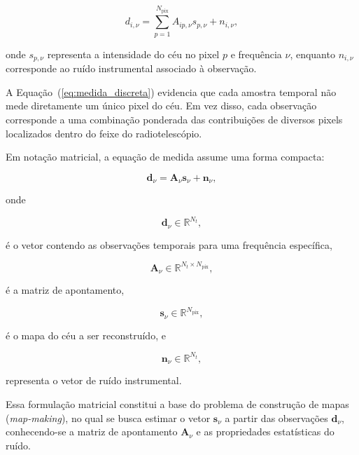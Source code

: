 \begin{equation}
d_{i,\nu}
=
\sum_{p=1}^{N_{\mathrm{pix}}}
A_{ip,\nu}
s_{p,\nu}
+
n_{i,\nu},
\label{eq:medida_discreta}
\end{equation}

onde $s_{p,\nu}$ representa a intensidade do céu no pixel $p$ e frequência $\nu$, enquanto $n_{i,\nu}$ corresponde ao ruído instrumental associado à observação.

A Equação~(\ref{eq:medida_discreta}) evidencia que cada amostra temporal não mede diretamente um único pixel do céu. Em vez disso, cada observação corresponde a uma combinação ponderada das contribuições de diversos pixels localizados dentro do feixe do radiotelescópio.

Em notação matricial, a equação de medida assume uma forma compacta:

\begin{equation}
\mathbf d_\nu
=
\mathbf A_\nu
\mathbf s_\nu
+
\mathbf n_\nu,
\label{eq:modelo_linear}
\end{equation}

onde

\begin{equation}
\mathbf d_\nu
\in
\mathbb{R}^{N_t},
\end{equation}

é o vetor contendo as observações temporais para uma frequência específica,

\begin{equation}
\mathbf A_\nu
\in
\mathbb{R}^{N_t\times N_{\mathrm{pix}}},
\end{equation}

é a matriz de apontamento,

\begin{equation}
\mathbf s_\nu
\in
\mathbb{R}^{N_{\mathrm{pix}}},
\end{equation}

é o mapa do céu a ser reconstruído, e

\begin{equation}
\mathbf n_\nu
\in
\mathbb{R}^{N_t},
\end{equation}

representa o vetor de ruído instrumental.

Essa formulação matricial constitui a base do problema de construção de mapas (\textit{map-making}), no qual se busca estimar o vetor $\mathbf s_\nu$ a partir das observações $\mathbf d_\nu$, conhecendo-se a matriz de apontamento $\mathbf A_\nu$ e as propriedades estatísticas do ruído.

